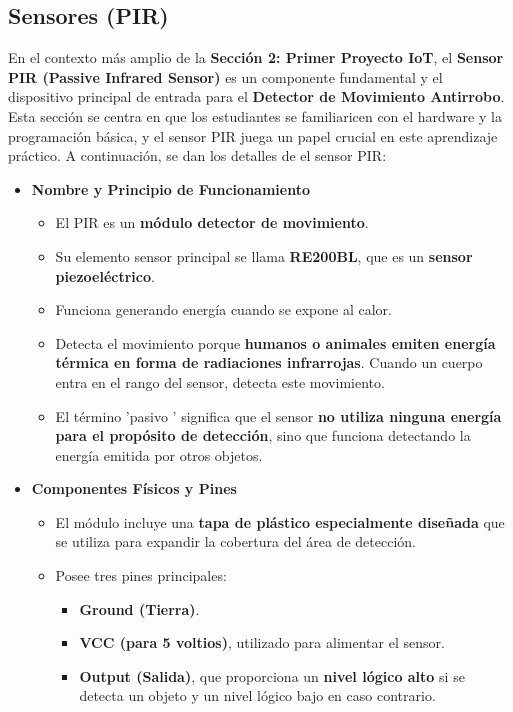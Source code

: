 \documentclass{report}
\begin{document}
\subsection{Sensores (PIR)}
En el contexto más amplio de la \textbf{Sección 2: Primer Proyecto IoT}, el \textbf{Sensor PIR (Passive Infrared Sensor)} es un componente fundamental y 
el dispositivo principal de entrada para el \textbf{Detector de Movimiento Antirrobo}. Esta sección se centra en que los estudiantes se familiaricen con 
el hardware y la programación básica, y el sensor PIR juega un papel crucial en este aprendizaje práctico. A continuación, se dan los detalles de el sensor 
PIR:
\begin{itemize}
    \item \textbf{Nombre y Principio de Funcionamiento}
    \begin{itemize}
        \item El PIR es un \textbf{módulo detector de movimiento}.
        \item Su elemento sensor principal se llama \textbf{RE200BL}, que es un \textbf{sensor piezoeléctrico}.
        \item Funciona generando energía cuando se expone al calor.
        \item Detecta el movimiento porque \textbf{humanos o animales emiten energía térmica en forma de radiaciones infrarrojas}. Cuando un cuerpo entra 
        en el rango del sensor, detecta este movimiento.
        \item El término  'pasivo ' significa que el sensor \textbf{no utiliza ninguna energía para el propósito de detección}, sino que funciona detectando 
        la energía emitida por otros objetos.
    \end{itemize}

    \item \textbf{Componentes Físicos y Pines}
    \begin{itemize}
        \item El módulo incluye una \textbf{tapa de plástico especialmente diseñada} que se utiliza para expandir la cobertura del área de detección.
        \item Posee tres pines principales:
        \begin{itemize}
            \item \textbf{Ground (Tierra)}.
            \item \textbf{VCC (para 5 voltios)}, utilizado para alimentar el sensor.
            \item \textbf{Output (Salida)}, que proporciona un \textbf{nivel lógico alto} si se detecta un objeto y un nivel lógico bajo en caso contrario.
        \end{itemize}
    \end{itemize}


\end{itemize}
\end{document}

